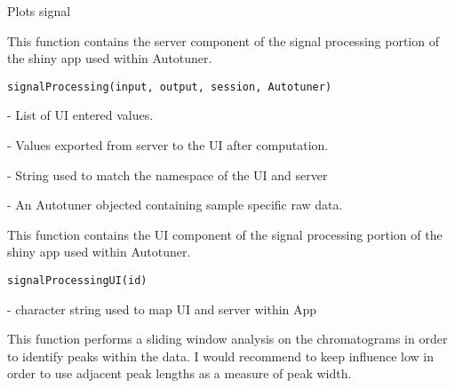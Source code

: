 \documentclass[a4paper]{book}
\begin{document}
%
\begin{Value}
Plots signal
\end{Value}
%
\begin{Description}\relax
This function contains the server component of the signal
processing portion of the shiny app used within Autotuner.
\end{Description}
%
\begin{Usage}
\begin{verbatim}
signalProcessing(input, output, session, Autotuner)
\end{verbatim}
\end{Usage}
%
\begin{Arguments}
\begin{ldescription}
\item[\code{input}] - List of UI entered values.

\item[\code{output}] - Values exported from server to the UI after computation.

\item[\code{session}] - String used to match the namespace of the UI and server

\item[\code{Autotuner}] - An Autotuner objected containing sample specific raw
data.
\end{ldescription}
\end{Arguments}
%
\begin{Description}\relax
This function contains the UI component of the signal processing
portion of the shiny app used within Autotuner.
\end{Description}
%
\begin{Usage}
\begin{verbatim}
signalProcessingUI(id)
\end{verbatim}
\end{Usage}
%
\begin{Arguments}
\begin{ldescription}
\item[\code{id}] - character string used to map UI and server within App
\end{ldescription}
\end{Arguments}
%
\begin{Description}\relax
This function performs a sliding window analysis on the chromatograms
in order to identify peaks within the data. I would recommend to keep influence
low in order to use adjacent peak lengths as a measure of peak width.
\end{Description}
\end{document}
